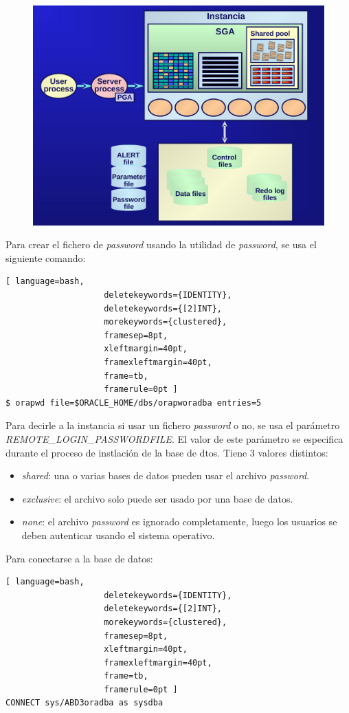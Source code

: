 \begin{figure}[H]
  \center
  \includegraphics[scale=0.3]{img/p13.png}
\end{figure}

Para crear el fichero de \textit{password} usando la utilidad de \textit{password}, se usa el siguiente comando:
\begin{lstlisting}[ language=bash,
                    deletekeywords={IDENTITY},
                    deletekeywords={[2]INT},
                    morekeywords={clustered},
                    framesep=8pt,
                    xleftmargin=40pt,
                    framexleftmargin=40pt,
                    frame=tb,
                    framerule=0pt ]
$ orapwd file=$ORACLE_HOME/dbs/orapworadba entries=5
\end{lstlisting}

Para decirle a la instancia si usar un fichero \textit{password} o no, se usa el parámetro \textit{REMOTE\_LOGIN\_PASSWORDFILE}. El valor de este parámetro se especifica durante el proceso de instlación de la base de dtos. Tiene 3 valores distintos:
\begin{itemize}
\item \textit{shared}: una o varias bases de datos pueden usar el archivo \textit{password}.
\item \textit{exclusive}: el archivo solo puede ser usado por una base de datos.
\item \textit{none}: el archivo \textit{password} es ignorado completamente, luego los usuarios se deben autenticar usando el sistema operativo.
\end{itemize}
Para conectarse a la base de datos:
\begin{lstlisting}[ language=bash,
                    deletekeywords={IDENTITY},
                    deletekeywords={[2]INT},
                    morekeywords={clustered},
                    framesep=8pt,
                    xleftmargin=40pt,
                    framexleftmargin=40pt,
                    frame=tb,
                    framerule=0pt ]
CONNECT sys/ABD3oradba as sysdba
\end{lstlisting}

